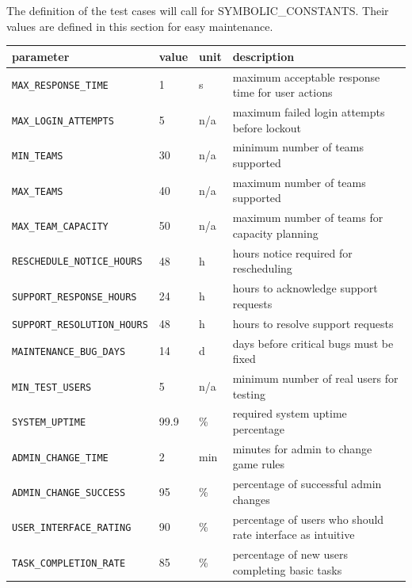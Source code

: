 \documentclass[12pt, titlepage]{article}
\begin{document}
The definition of the test cases will call for SYMBOLIC\_CONSTANTS.
Their values are defined in this section for easy maintenance.
\begin{longtable}{|l|l|l|p{5cm}|}
    \hline
    parameter & value & unit & description \\ \hline
    \texttt{MAX\_RESPONSE\_TIME}\label{MAX_RESPONSE_TIME} & 1 & s & maximum acceptable response time for user actions \\ \hline
    \texttt{MAX\_LOGIN\_ATTEMPTS}\label{MAX_LOGIN_ATTEMPTS} & 5 & n/a & maximum failed login attempts before lockout \\ \hline
    \texttt{MIN\_TEAMS}\label{MIN_TEAMS} & 30 & n/a & minimum number of teams supported \\ \hline
    \texttt{MAX\_TEAMS}\label{MAX_TEAMS} & 40 & n/a & maximum number of teams supported \\ \hline
    \texttt{MAX\_TEAM\_CAPACITY}\label{MAX_TEAM_CAPACITY} & 50 & n/a & maximum number of teams for capacity planning \\ \hline
    \texttt{RESCHEDULE\_NOTICE\_HOURS}\label{RESCHEDULE_NOTICE_HOURS} & 48 & h & hours notice required for rescheduling \\ \hline
    \texttt{SUPPORT\_RESPONSE\_HOURS}\label{SUPPORT_RESPONSE_HOURS} & 24 & h & hours to acknowledge support requests \\ \hline
    \texttt{SUPPORT\_RESOLUTION\_HOURS}\label{SUPPORT_RESOLUTION_HOURS} & 48 & h & hours to resolve support requests \\ \hline
    \texttt{MAINTENANCE\_BUG\_DAYS}\label{MAINTENANCE_BUG_DAYS} & 14 & d & days before critical bugs must be fixed \\ \hline
    \texttt{MIN\_TEST\_USERS}\label{MIN_TEST_USERS} & 5 & n/a & minimum number of real users for testing \\ \hline
    \texttt{SYSTEM\_UPTIME}\label{SYSTEM_UPTIME} & 99.9 & \% & required system uptime percentage \\ \hline
    \texttt{ADMIN\_CHANGE\_TIME}\label{ADMIN_CHANGE_TIME} & 2 & min & minutes for admin to change game rules \\ \hline
    \texttt{ADMIN\_CHANGE\_SUCCESS}\label{ADMIN_CHANGE_SUCCESS} & 95 & \% & percentage of successful admin changes \\ \hline
    \texttt{USER\_INTERFACE\_RATING}\label{USER_INTERFACE_RATING} & 90 & \% & percentage of users who should rate interface as intuitive \\ \hline
    \texttt{TASK\_COMPLETION\_RATE}\label{TASK_COMPLETION_RATE} & 85 & \% & percentage of new users completing basic tasks \\ \hline

\end{longtable}
\end{document}
